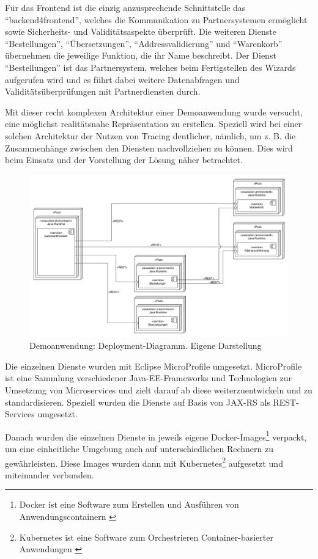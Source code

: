 Für das Frontend ist die einzig anzusprechende Schnittstelle das \enquote{backend4frontend}, welches die Kommunikation zu Partnersystemen ermöglicht sowie Sicherheits- und Validitätsaspekte überprüft. Die weiteren Dienste \enquote{Bestellungen}, \enquote{Übersetzungen}, \enquote{Addressvalidierung} und \enquote{Warenkorb} übernehmen die jeweilige Funktion, die ihr Name beschreibt. Der Dienst \enquote{Bestellungen} ist das Partnersystem, welches beim Fertigstellen des Wizards aufgerufen wird und es führt dabei weitere Datenabfragen und Validitätsüberprüfungen mit Partnerdiensten durch.

Mit dieser recht komplexen Architektur einer Demoanwendung wurde versucht, eine möglichst realitätsnahe Repräsentation zu erstellen. Speziell wird bei einer solchen Architektur der Nutzen von Tracing deutlicher, nämlich, um z. B. die Zusammenhänge zwischen den Diensten nachvollziehen zu können. Dies wird beim Einsatz und der Vorstellung der Lösung näher betrachtet.

\begin{figure}[H]
	\centering
	\includegraphics[width=1.00\linewidth]{img/04_erstellung-poc/demoanwendung_deployment.png}
	\caption{Demoanwendung: Deployment-Diagramm. Eigene Darstellung}
	\label{fig:demoanwendung_deployment}
\end{figure}

Die einzelnen Dienste wurden mit Eclipse MicroProfile \cite{EclipseMicroprofile} umgesetzt. MicroProfile ist eine Sammlung verschiedener Java-EE-Frameworks und Technologien zur Umsetzung von Microservices und zielt darauf ab diese weiterzuentwickeln und zu standardisieren. Speziell wurden die Dienste auf Basis von JAX-RS als REST-Services umgesetzt. 

Danach wurden die einzelnen Dienste in jeweils eigene Docker-Images\footnote{Docker \cite{Docker} ist eine Software zum Erstellen und Ausführen von Anwendungscontainern \cite{PatternsForSoftwareOrchestration}} verpackt, um eine einheitliche Umgebung auch auf unterschiedlichen Rechnern zu gewährleisten. Diese Images wurden dann mit Kubernetes\footnote{Kubernetes \cite{Kubernetes} ist eine Software zum Orchestrieren Container-basierter Anwendungen \cite{KeyCharacteristicsOfAContainerOrchestrationPlatform}} aufgesetzt und miteinander verbunden.

